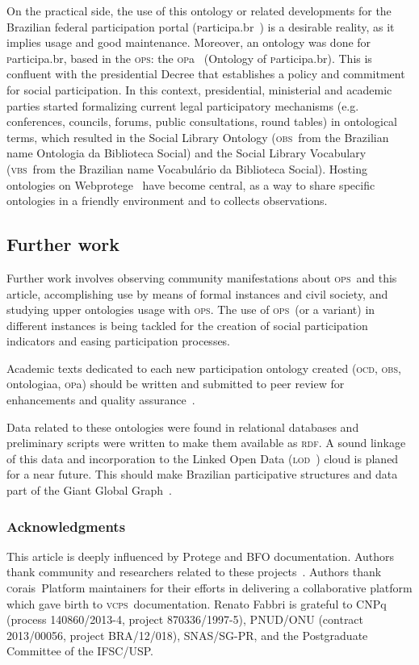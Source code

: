 \documentclass[10pt,letterpaper]{article}
\newcommand{\ops}{\textsc{ops}}
\newcommand{\vcps}{\textsc{vcps}}
\newcommand{\opa}{\textsc{op}a}
\newcommand{\ocd}{\textsc{ocd}}
\newcommand{\ontologiaa}{\textsc{o}ntologiaa}
\newcommand{\obs}{\textsc{obs}}
\newcommand{\rdf}{\textsc{rdf}}
\newcommand{\participa}{\textsc{p}articipa.br}
\newcommand{\vbs}{\textsc{vbs}}
\newcommand{\lod}{\textsc{lod}}
\newcommand{\corais}{\textsc{c}orais}
\begin{document}
On the practical side, the use of this ontology or related developments for the Brazilian federal participation portal (\participa~\cite{participa}) is a desirable reality, as it implies usage and good maintenance.  Moreover, an ontology was done for \participa, based in the \ops: the \opa~\cite{pnud5} (Ontology of \participa). This is confluent with the presidential Decree that establishes a policy and commitment for social participation\cite{decree}. In this context, presidential, ministerial and academic parties started formalizing current legal participatory mechanisms (e.g. conferences, councils, forums, public consultations, round tables) in ontological terms, which resulted in the Social Library Ontology (\obs\ from the Brazilian name Ontologia da Biblioteca Social) and the Social Library Vocabulary (\vbs\ from the Brazilian name Vocabul\'ario da Biblioteca Social).
Hosting ontologies on Webprotege~\cite{webprotege} have become central, as a way to share specific ontologies in a friendly environment and to collects observations.

\subsection{Further work}
Further work involves observing community manifestations about \ops\ and this article, accomplishing use by means of formal instances and civil society, and studying upper ontologies usage with \ops. The use of \ops\ (or a variant) in different instances is being tackled for the creation of social participation indicators and easing participation processes.

Academic texts dedicated to each new participation ontology created (\ocd, \obs, \ontologiaa, \opa) should be written and submitted to peer review for enhancements and quality assurance~\cite{pnud5}.

Data related to these ontologies were found in relational databases and preliminary scripts were written to make them available as \rdf. A sound linkage of this data and incorporation to the Linked Open Data (\lod~\cite{lod}) cloud is planed for a near future. This should make Brazilian participative structures and data part of the Giant Global Graph~\cite{ggg}.

\subsubsection*{Acknowledgments}
This article is deeply influenced by Protege and BFO documentation. Authors thank community and researchers related to these projects~\cite{protege,bfo}.
Authors thank \corais\ Platform maintainers for their efforts in delivering a collaborative platform which gave birth to \vcps\ documentation.
Renato Fabbri is grateful to CNPq (process 140860/2013-4, project 870336/1997-5), PNUD/ONU (contract 2013/00056, project BRA/12/018), SNAS/SG-PR, and the Postgraduate Committee of the IFSC/USP. 
\end{document}
